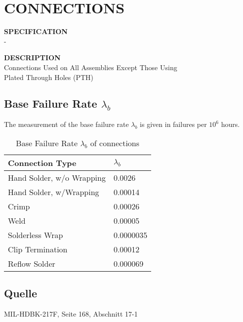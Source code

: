 \section{CONNECTIONS}

\begin{minipage}[t]{0.29\textwidth}
    \textbf{SPECIFICATION}\\
    -
\end{minipage}
\begin{minipage}[t]{0.7\textwidth}
    \textbf{DESCRIPTION}\\
    Connections Used on All Assemblies Except Those Using \\Plated Through Holes (PTH)
\end{minipage}

\subsection{Base Failure Rate $\lambda_b$}
The measurement of the base failure rate $\lambda_b$ is given in failures per $10^6$ hours.
\begin{table}[ht]
{\centering

\begin{tabular}{|p{5cm}|p{5cm}|}
    \hline
    \textbf{Connection Type} & \textbf{$\lambda_b$} \\
    \hline
    Hand Solder, w/o Wrapping & 0.0026 \\
    \hline
    Hand Solder, w/Wrapping & 0.00014 \\
    \hline
    Crimp & 0.00026 \\
    \hline
    Weld & 0.00005 \\
    \hline
    Solderless Wrap & 0.0000035 \\
    \hline
    Clip Termination & 0.00012 \\
    \hline
    Reflow Solder & 0.000069 \\
    \hline
\end{tabular}

\caption{Base Failure Rate $\lambda_b$ of connections}

\label{tab:bfr_connections}
\par}
\end{table}
\subsection*{Quelle}
MIL-HDBK-217F, Seite 168, Abschnitt 17-1
